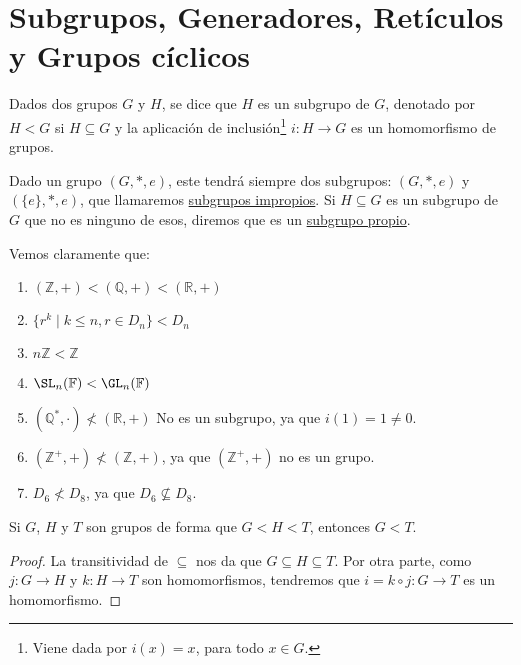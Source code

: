 \chapter{Subgrupos, Generadores, Retículos y Grupos cíclicos}
\begin{definicion}[Subgrupo]
    Dados dos grupos $G$ y $H$, se dice que $H$ es un subgrupo de $G$, denotado por $H < G$ si $H\subseteq G$ y la aplicación de inclusión\footnote{Viene dada por $i(x) = x$, para todo $x\in G$.} $i:H\to G$ es un homomorfismo de grupos.
\end{definicion}

\begin{observacion}
    Dado un grupo $(G,\ast,e)$, este tendrá siempre dos subgrupos: $(G,\ast,e)$ y $(\{e\},\ast,e)$, que llamaremos \underline{subgrupos impropios}. Si $H\subseteq G$ es un subgrupo de $G$ que no es ninguno de esos, diremos que es un \underline{subgrupo propio}.
\end{observacion}

\begin{ejemplo}
    Vemos claramente que:
    \begin{enumerate}
        \item $(\mathbb{Z},+) < (\mathbb{Q},+) < (\mathbb{R}, +)$
        \item $\{r^k \mid k\leq n, r\in D_n\} < D_n$ 
        \item $n\mathbb{Z} < \mathbb{Z}$ 
        \item $\SL_n(\mathbb{F}) < \GL_n(\mathbb{F})$
        \item $(\mathbb{Q}^\ast, \cdot) \not< (\mathbb{R}, +)$ No es un subgrupo, ya que $i(1) = 1 \neq 0$.
        \item $(\mathbb{Z}^+, +) \not< (\mathbb{Z}, +)$, ya que $(\mathbb{Z}^+, +)$ no es un grupo.
        \item $D_6 \not< D_8$, ya que $D_6\nsubseteq D_8$.
    \end{enumerate}
\end{ejemplo}

\begin{observacion}
    Si $G$, $H$ y $T$ son grupos de forma que $G < H < T$, entonces $G < T$.
    \begin{proof}
        La transitividad de $\subseteq $ nos da que $G\subseteq H\subseteq T$. Por otra parte, como $j:G\to H$ y $k:H\to T$ son homomorfismos, tendremos que $i=k\circ j:G\to T$ es un homomorfismo.
    \end{proof}
\end{observacion}

